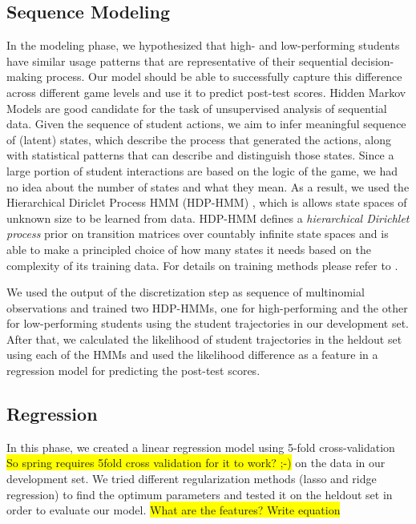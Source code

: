 \documentclass{sigchi}
\newcommand{\hl}[1]{\colorbox{yellow}{#1}}
\begin{document}
\subsection{Sequence Modeling}
In the modeling phase, we hypothesized that high- and low-performing students have similar usage patterns that are representative of their sequential decision-making process. 
Our model should be able to successfully capture this difference across different game levels and use it to predict post-test scores.
Hidden Markov Models are good candidate for the task of unsupervised analysis of sequential data.
Given the sequence of student actions, we aim to infer meaningful sequence of (latent) states, which describe the process that generated the actions, along with statistical patterns that can describe and distinguish those states.
Since a large portion of student interactions are based on the logic of the game, we had no idea about the number of states and what they mean.
As a result, we used the Hierarchical Diriclet Process HMM (HDP-HMM) \cite{fox2008hdp}, which is allows state spaces of unknown size to be learned from data. 
HDP-HMM defines a \textit{hierarchical Dirichlet process} prior on transition matrices over countably infinite state spaces and is able to make a principled choice of how many states it needs based on the complexity of its training data. 
For details on training methods please refer to \cite{fox2008hdp}.

We used the output of the discretization step as sequence of multinomial observations and trained two HDP-HMMs, one for high-performing and the other for low-performing students using the student trajectories in our development set. After that, we calculated the likelihood of student trajectories in the heldout set using each of the HMMs and used the likelihood difference as a feature in a regression model for predicting the post-test scores.

\subsection{Regression}

In this phase, we created a linear regression model using 5-fold cross-validation \hl{So spring requires 5fold cross validation for it to work? ;-)} on the data in our development set. We tried different regularization methods (lasso and ridge regression) to find the optimum parameters and tested it on the heldout set in order to evaluate our model. 
\hl{What are the features? Write equation}
\end{document}
